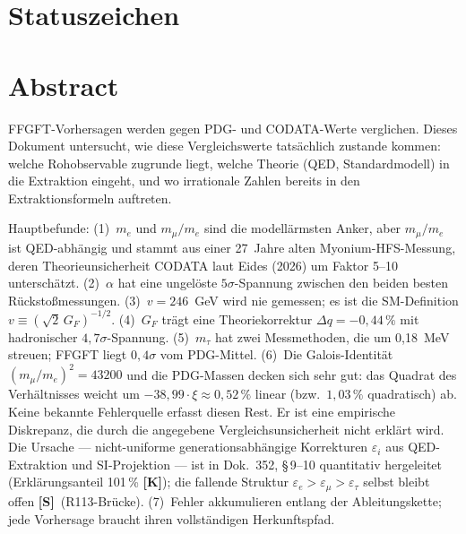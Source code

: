 \providecommand{\BM}{\textbf{[B]}}
\providecommand{\KM}{\textbf{[K]}}
\providecommand{\SM}{\textbf{[S]}}
\providecommand{\QM}{\textbf{[Q]}}

{}

\section*{Statuszeichen}


\section*{Abstract}

FFGFT-Vorhersagen werden gegen PDG- und CODATA-Werte verglichen. Dieses Dokument untersucht, wie diese Vergleichswerte tatsächlich zustande kommen: welche Rohobservable zugrunde liegt, welche Theorie (QED, Standardmodell) in die Extraktion eingeht, und wo irrationale Zahlen bereits in den Extraktionsformeln auftreten.

Hauptbefunde: (1)~$m_e$ und $m_\mu/m_e$ sind die modellärmsten Anker, aber $m_\mu/m_e$ ist QED-abhängig und stammt aus einer 27~Jahre alten Myonium-HFS-Messung, deren Theorieunsicherheit CODATA laut Eides (2026) um Faktor 5--10 unterschätzt. (2)~$\alpha$ hat eine ungelöste $5\sigma$-Spannung zwischen den beiden besten Rückstoßmessungen. (3)~$v=246$~GeV wird nie gemessen; es ist die SM-Definition $v\equiv(\sqrt2\,G_F)^{-1/2}$. (4)~$G_F$ trägt eine Theoriekorrektur $\Delta q=-0{,}44\,\%$ mit hadronischer $4{,}7\sigma$-Spannung. (5)~$m_\tau$ hat zwei Messmethoden, die um 0{,}18~MeV streuen; FFGFT liegt $0{,}4\sigma$ vom PDG-Mittel. (6)~Die Galois-Identität $(m_\mu/m_e)^2=43200$ und die PDG-Massen decken sich sehr gut: das Quadrat des Verhältnisses weicht um $-38{,}99\cdot\xi\approx0{,}52\,\%$ linear (bzw.\ $1{,}03\,\%$ quadratisch) ab. Keine bekannte Fehlerquelle erfasst diesen Rest. Er ist eine empirische Diskrepanz, die durch die angegebene Vergleichsunsicherheit nicht erklärt wird. Die Ursache --- nicht-uniforme generationsabhängige Korrekturen $\varepsilon_i$ aus QED-Extraktion und SI-Projektion --- ist in Dok.~352, §\,9--10 quantitativ hergeleitet (Erklärungsanteil 101\,\% \KM); die fallende Struktur $\varepsilon_e > \varepsilon_\mu > \varepsilon_\tau$ selbst bleibt offen \SM\ (R113-Brücke). (7)~Fehler akkumulieren entlang der Ableitungskette; jede Vorhersage braucht ihren vollständigen Herkunftspfad.

